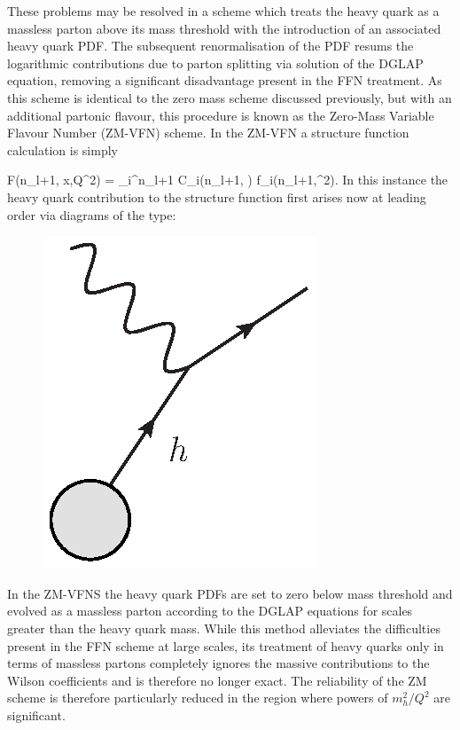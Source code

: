These problems may be resolved in a scheme which treats the heavy quark as a massless parton above its mass threshold with the introduction of an associated heavy quark PDF. The subsequent renormalisation of the PDF resums the logarithmic contributions due to parton splitting via solution of the DGLAP equation, removing a significant disadvantage present in the FFN treatment. As this scheme is identical to the zero mass scheme discussed previously, but with an additional partonic flavour, this procedure is known as the Zero-Mass Variable Flavour Number (ZM-VFN) scheme. In the ZM-VFN a structure function calculation is simply

\be F(n_l+1, x,Q^2) = \sum_i^{n_l+1} C_i\left(n_l+1, \right) \otimes f_i(n_l+1,\mu^2). \label{eq:ZMVFN} \ee
In this instance the heavy quark contribution to the structure function first arises now at leading order via diagrams of the type:

\begin{figure}[h]
\centering
\includegraphics[scale=0.6]{2-PDFs/figs/ZMVFNS.eps}
\end{figure}

In the ZM-VFNS the heavy quark PDFs are set to zero below mass threshold and evolved as a massless parton according to the DGLAP equations for scales greater than the heavy quark mass. While this method alleviates the difficulties present in the FFN scheme at large scales, its treatment of heavy quarks only in terms of massless partons completely ignores the massive contributions to the Wilson coefficients and is therefore no longer exact. The reliability of the ZM scheme is therefore particularly reduced in the region where powers of $m_h^2/Q^2$ are significant. 
